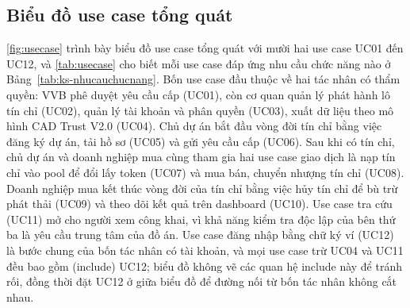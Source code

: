 \subsection*{Biểu đồ use case tổng quát}
\label{subsec:usecase}

\autoref{fig:usecase} trình bày biểu đồ use case tổng quát với mười hai use case UC01 đến UC12, và \autoref{tab:usecase} cho biết mỗi use case đáp ứng nhu cầu chức năng nào ở Bảng~\ref{tab:ks-nhucauchucnang}. Bốn use case đầu thuộc về hai tác nhân có thẩm quyền: VVB phê duyệt yêu cầu cấp (UC01), còn cơ quan quản lý phát hành lô tín chỉ (UC02), quản lý tài khoản và phân quyền (UC03), xuất dữ liệu theo mô hình CAD Trust V2.0 (UC04). Chủ dự án bắt đầu vòng đời tín chỉ bằng việc đăng ký dự án, tải hồ sơ (UC05) và gửi yêu cầu cấp (UC06). Sau khi có tín chỉ, chủ dự án và doanh nghiệp mua cùng tham gia hai use case giao dịch là nạp tín chỉ vào pool để đổi lấy token (UC07) và mua bán, chuyển nhượng tín chỉ (UC08). Doanh nghiệp mua kết thúc vòng đời của tín chỉ bằng việc hủy tín chỉ để bù trừ phát thải (UC09) và theo dõi kết quả trên dashboard (UC10). Use case tra cứu (UC11) mở cho người xem công khai, vì khả năng kiểm tra độc lập của bên thứ ba là yêu cầu trung tâm của đồ án. Use case đăng nhập bằng chữ ký ví (UC12) là bước chung của bốn tác nhân có tài khoản, và mọi use case trừ UC04 và UC11 đều bao gồm (include) UC12; biểu đồ không vẽ các quan hệ include này để tránh rối, đồng thời đặt UC12 ở giữa biểu đồ để đường nối từ bốn tác nhân không cắt nhau.

\HinhUseCase


